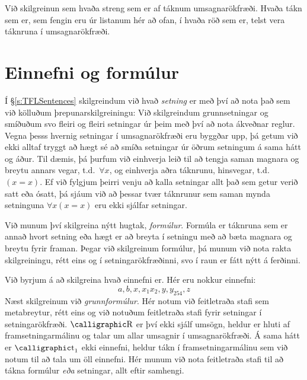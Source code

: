 Við skilgreinun  sem hvaða streng sem er af táknum umsagnarökfræði. Hvaða tákn sem er, sem fengin eru úr listanum hér að ofan, í hvaða röð sem er, telst vera táknruna í umsagnarökfræði.

\section{Einnefni og formúlur} \label{formula}

Í \S\ref{s:TFLSentences} skilgreindum við hvað \emph{setning} er með því að nota það sem við kölluðum þrepunarskilgreiningu: Við skilgreindum grunnsetningar og smíðuðum svo fleiri og fleiri setningar úr þeim með því að nota ákveðnar reglur. Vegna þesss hvernig setningar í umsagnarökfræði eru byggðar upp, þá getum við ekki alltaf tryggt að hægt sé að smíða setningar úr öðrum setningum á sama hátt og áður. Til dæmis, þá þurfum við einhverja leið til að tengja saman magnara og breytu annars vegar, t.d.\ $\forall x$, og einhverja aðra táknrunu, hinsvegar, t.d.\ $(x = x)$. Ef við fylgjum þeirri venju að kalla setningar allt það sem getur verið satt eða ósatt, þá sjáum við að þessar tvær táknrunur sem saman mynda setninguna $\forall x(x = x)$ eru ekki sjálfar setningar.

Við munum því skilgreina nýtt hugtak, \emph{formúlur}. Formúla er táknruna sem er annað hvort setning eða hægt er að breyta í setningu með að bæta magnara og breytu fyrir framan. Þegar við skilgreinum formúlur, þá munum við nota rakta skilgreiningu, rétt eins og í setningarökfræðinni, svo í raun er fátt nýtt á ferðinni.

Við byrjum á að skilgreina hvað einnefni er.
Hér eru nokkur einnefni:
	$$a, b, x, x_1 x_2, y, y_{254}, z$$
Næst skilgreinum við \emph{grunnformúlur}.
Hér notum við feitletraða stafi sem metabreytur, rétt eins og við notuðum feitletraða stafi fyrir setningar í setningarökfræði. $\meta{R}$ er því ekki sjálf umsögn, heldur er hluti af framsetningarmálinu og talar um allar umsagnir í umsagnarökfræði. Á sama hátt er $\meta{t}_1$ ekki einnefni, heldur tákn í framsetningarmálinu sem við notum til að tala um öll einnefni. Hér munum við nota feitletraða stafi til að tákna formúlur \emph{eða} setningar, allt eftir samhengi.
		
